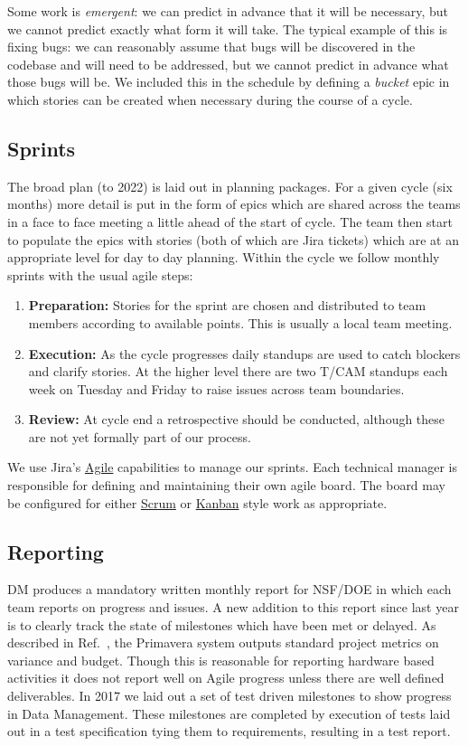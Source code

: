 Some work is \emph{emergent}: we can predict in advance that it will be necessary, but we cannot
predict exactly what form it will take. The typical example of this is fixing bugs: we can reasonably
assume that bugs will be discovered in the codebase and will need to be addressed,
but we cannot predict in advance what those bugs will be.
We included this in the schedule by defining a \emph{bucket} epic in which stories can be created
when necessary during the course of a cycle.

\subsection{Sprints} \label{sec:sprint} \label{sec:jira_ticket}
The broad plan (to 2022) is laid out in planning packages.
For a  given  cycle (six months)   more detail is put in the form of epics which  are shared across the teams in a face to face meeting a little ahead of the start of cycle.  The team then start to populate the epics with stories (both of which are Jira tickets)  which are at an appropriate level for day to day planning.
Within the cycle we follow monthly sprints with the usual agile steps:
\begin{enumerate}
\item \textbf{Preparation:} Stories for the sprint are chosen and distributed to team members according to available points. This is usually a local team meeting.
\item \textbf{Execution:} As the cycle progresses daily standups are used to catch blockers and clarify stories. At the higher level there are two T/CAM standups each week on Tuesday and Friday to raise issues across team boundaries.
\item \textbf{Review:} At cycle end a retrospective should be conducted, although these are not yet formally part of our process.
\end{enumerate}

We use Jira's
\href{https://www.atlassian.com/software/jira/agile}{Agile} capabilities
to manage our sprints. Each technical manager is responsible for
defining and maintaining their own agile board. The board may be
configured for either
\href{https://en.wikipedia.org/wiki/Scrum_(software_development)}{Scrum}
or \href{https://en.wikipedia.org/wiki/Kanban_(development)}{Kanban}
style work as appropriate.

\subsection{Reporting}
DM produces a mandatory written monthly report for NSF/DOE in which each team reports on progress and issues. A new addition to this report since last year is to clearly track the state of milestones which have been met or delayed.
As described in Ref.~, the Primavera system outputs standard project metrics on variance and budget.
Though this is reasonable  for reporting hardware based activities it does not report well on Agile progress unless there are well defined deliverables.
In 2017 we laid out a set of test driven milestones to show progress in Data Management.\cite{LDM-503}
These milestones are completed by execution of tests laid out in a test specification tying them to requirements, resulting in a test report.
